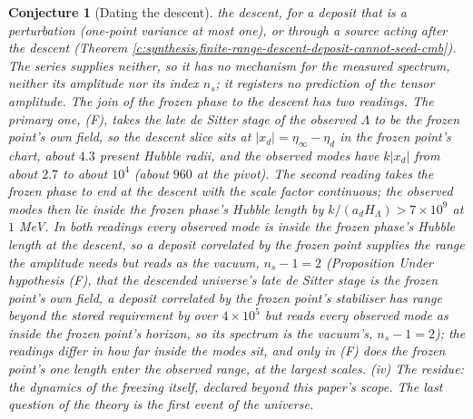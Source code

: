 \documentclass[11pt]{article}
\newtheorem{conjecture}[theorem]{Conjecture}
\theoremstyle{definition}
\theoremstyle{plain}
\begin{document}
\begin{conjecture}[Dating the descent]
the descent, for a deposit that is a perturbation (one-point variance at most one), or through a source acting after the descent (Theorem \ref{c:synthesis.finite-range-descent-deposit-cannot-seed-cmb}). The series supplies neither, so it has no mechanism for the measured spectrum, neither its amplitude nor its index $n_{s}$; it registers no prediction of the tensor amplitude. The join of the frozen phase to the descent has two readings. The primary one, (F), takes the late de Sitter stage of the observed $\Lambda$ to be the frozen point's own field, so the descent slice sits at $|x_{d}| = \eta_{\infty} - \eta_{d}$ in the frozen point's chart, about $4.3$ present Hubble radii, and the observed modes have $k|x_{d}|$ from about $2.7$ to about $10^{4}$ (about $960$ at the pivot). The second reading takes the frozen phase to end at the descent with the scale factor continuous; the observed modes then lie inside the frozen phase's Hubble length by $k/(a_{d}H_{\Lambda}) > 7 \times 10^{9}$ at $1$ MeV. In both readings every observed mode is inside the frozen phase's Hubble length at the descent, so a deposit correlated by the frozen point supplies the range the amplitude needs but reads as the vacuum, $n_{s} - 1 = 2$ (Proposition \emph{Under hypothesis (F), that the descended universe's late de Sitter stage is the frozen point's own field, a deposit correlated by the frozen point's stabiliser has range beyond the stored requirement by over $4 \times 10^{5}$ but reads every observed mode as inside the frozen point's horizon, so its spectrum is the vacuum's, $n_{s} - 1 = 2$}); the readings differ in how far inside the modes sit, and only in (F) does the frozen point's one length enter the observed range, at the largest scales. (iv) The residue: the dynamics of the freezing itself, declared beyond this paper's scope. The last question of the theory is the first event of the universe.
\end{conjecture}
\end{document}
